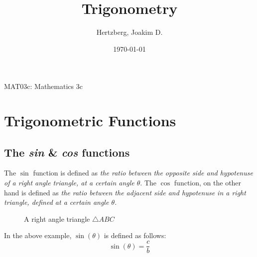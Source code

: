 \documentclass[a4paper, 12pt]{article}
\title{Trigonometry}
\author{Hertzberg, Joakim D.}
\date{\today}
\begin{document}
\begin{titlepage}
\clearpage\maketitle
\begin{center}
MAT03c: Mathematics 3c
\end{center}
\thispagestyle{empty}
\end{titlepage}



\section{Trigonometric Functions}


\subsection{The \emph{sin} \& \emph{cos} functions}


The $\sin$ function is defined as \emph{the ratio between the opposite side and hypotenuse of a right angle triangle, at a certain angle $\theta$}. The $\cos$ function, on the other hand is defined as \emph{the ratio between the adjacent side and hypotenuse in a right triangle, defined at a certain angle $\theta$.}

\begin{figure}
\begin{center}
\end{center}
\caption{A right angle triangle $\triangle ABC$}
\label{fig:tri1}
\end{figure} \bigbreak



In the above example, $\sin(\theta)$ is defined as follows: $$\sin(\theta) = \frac{c}{b}$$
\end{document}
